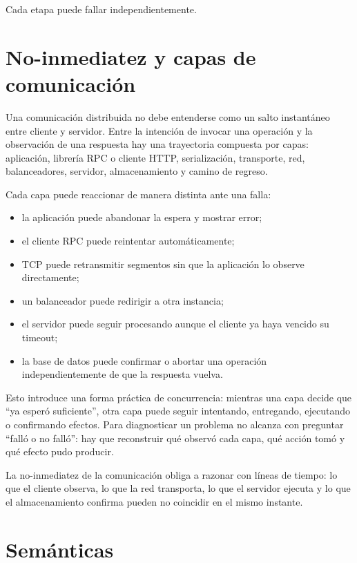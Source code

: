 \documentclass[variant=apuntes,cover=institutional,mode=screen]{ua-engineering-v6-article}
\begin{document}
Cada etapa puede fallar independientemente.

\section{No-inmediatez y capas de comunicación}

Una comunicación distribuida no debe entenderse como un salto instantáneo entre cliente y servidor. Entre la intención de invocar una operación y la observación de una respuesta hay una trayectoria compuesta por capas: aplicación, librería RPC o cliente HTTP, serialización, transporte, red, balanceadores, servidor, almacenamiento y camino de regreso.

Cada capa puede reaccionar de manera distinta ante una falla:
\begin{itemize}
\item la aplicación puede abandonar la espera y mostrar error;
\item el cliente RPC puede reintentar automáticamente;
\item TCP puede retransmitir segmentos sin que la aplicación lo observe directamente;
\item un balanceador puede redirigir a otra instancia;
\item el servidor puede seguir procesando aunque el cliente ya haya vencido su timeout;
\item la base de datos puede confirmar o abortar una operación independientemente de que la respuesta vuelva.
\end{itemize}

Esto introduce una forma práctica de concurrencia: mientras una capa decide que ``ya esperó suficiente'', otra capa puede seguir intentando, entregando, ejecutando o confirmando efectos. Para diagnosticar un problema no alcanza con preguntar ``falló o no falló'': hay que reconstruir qué observó cada capa, qué acción tomó y qué efecto pudo producir.

\begin{uakeybox}
La no-inmediatez de la comunicación obliga a razonar con líneas de tiempo: lo que el cliente observa, lo que la red transporta, lo que el servidor ejecuta y lo que el almacenamiento confirma pueden no coincidir en el mismo instante.
\end{uakeybox}

\section{Semánticas}
\end{document}
